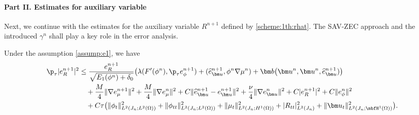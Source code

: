 \paragraph{\bf \indent Part II. Estimates for auxiliary variable}
Next, we continue with the estimates for the auxiliary variable $R^{n+1}$ defined by \eqref{scheme:1th:rhat}. The SAV-ZEC approach and the introduced $\gamma^n$ shall play a key role in the error analysis. 
\begin{lemma} \label{lem:err:r}
	Under the assumption \eqref{assump:e1}, we have
	\begin{equation*}  
		\begin{aligned}
			\p_\tau |e_R^{n+1}|^2 
			& \leq  \frac{e_R^{n+1}}{\sqrt{E_1(\phi^n)+\delta_0}} \big(\lambda(F^{\prime}(\phi^n), \p_\tau   e_\phi^{n+1})+(\widehat{e}_{\bm u}^{n+1}, \phi^n \nabla \mu^n) +  \bm b \big(\bm u^n, \bm u^n, \widehat{e}_{\bm u}^{n+1})\big) \\
			& \quad  + \frac{M}{4}\|\nabla e_{\mu}^{n+1}\|^2  
			+  \frac{M}{4}\|\nabla e_{\mu}^{n}\|^2
			+ C\|\widehat{e}_{\bm u}^{n+1}-e_{\bm u}^{n+1}\|^2
			+ \frac{\nu}{4}\|\nabla e_{\bm u}^n\|^2 + C|e_R^{n+1}|^2  +C\| e_{\phi}^n\|^2  \\
			& \quad+  C \tau \big(
			\|\phi_{t}\|_{L^2(J_n ; L^2(\Omega))}^2 +\|\phi_{tt}\|_{L^2(J_n ; L^2(\Omega))}^2 +\|\mu_t\|_{L^2(J_n ; H^1(\Omega))}^2 
			    +  |R_{tt}|_{L^2(J_n)}^2+\|\bm u_t\|_{L^2(J_n ; \mbfH^1(\Omega))}^2\big).
		\end{aligned}
	\end{equation*}
\end{lemma}
